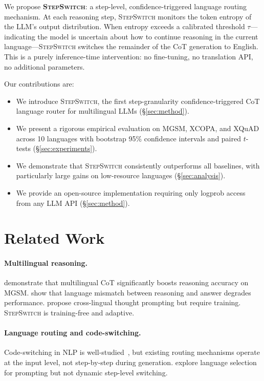 \documentclass{article}
\newcommand{\stepswitch}{\textsc{StepSwitch}}
\begin{document}
We propose \textbf{\stepswitch{}}: a step-level, confidence-triggered language routing mechanism. At each reasoning step, \stepswitch{} monitors the token entropy of the LLM's output distribution. When entropy exceeds a calibrated threshold $\tau$---indicating the model is uncertain about how to continue reasoning in the current language---\stepswitch{} switches the remainder of the CoT generation to English. This is a purely inference-time intervention: no fine-tuning, no translation API, no additional parameters.

Our contributions are:
\begin{itemize}
    \item We introduce \stepswitch{}, the first step-granularity confidence-triggered CoT language router for multilingual LLMs (\S\ref{sec:method}).
    \item We present a rigorous empirical evaluation on MGSM, XCOPA, and XQuAD across 10 languages with bootstrap 95\% confidence intervals and paired $t$-tests (\S\ref{sec:experiments}).
    \item We demonstrate that \stepswitch{} consistently outperforms all baselines, with particularly large gains on low-resource languages (\S\ref{sec:analysis}).
    \item We provide an open-source implementation requiring only logprob access from any LLM API (\S\ref{sec:method}).
\end{itemize}

\section{Related Work}
\label{sec:related}

\paragraph{Multilingual reasoning.} \citet{shi2022language} demonstrate that multilingual CoT significantly boosts reasoning accuracy on MGSM. \citet{huang2023not} show that language mismatch between reasoning and answer degrades performance. \citet{qin2023cross} propose cross-lingual thought prompting but require training. \stepswitch{} is training-free and adaptive.

\paragraph{Language routing and code-switching.} Code-switching in NLP is well-studied~\citep{pratapa2018language,winata2021language}, but existing routing mechanisms operate at the input level, not step-by-step during generation. \citet{zhang2023don} explore language selection for prompting but not dynamic step-level switching.
\end{document}
